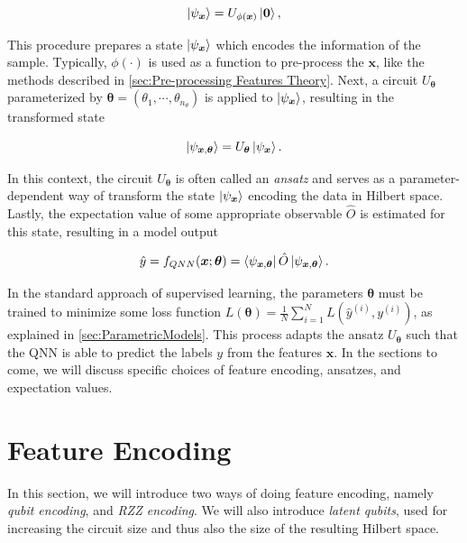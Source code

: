 \begin{equation}
    \ket{\psi_{\boldsymbol{x}}} = U_{\phi(\boldsymbol{x})}\ket{\boldsymbol{0}},
\end{equation}

This procedure prepares a state $\ket{\psi_{\boldsymbol{x}}}$ which encodes the information of the sample. Typically, $\phi(\cdot)$ is used as a function to pre-process the $\boldsymbol{x}$, like the methods described in \cref{sec:Pre-processing Features Theory}. Next, a circuit $U_{\boldsymbol{\theta}}$ parameterized by $\boldsymbol{\theta} = (\theta_1, \cdots, \theta_{n_{\theta}})$ is applied to $\ket{\psi_{\boldsymbol{x}}}$, resulting in the transformed state

\begin{equation}
    \ket{\psi_{\boldsymbol{x}, \boldsymbol{\theta}}} = U_{\boldsymbol{\theta}}\ket{\psi_{\boldsymbol{x}}}.
\end{equation} 

In this context, the circuit $U_{\boldsymbol{\theta}}$ is often called an \emph{ansatz} and serves as a parameter-dependent way of transform the state $\ket{\psi_{\boldsymbol{x}}}$ encoding the data in Hilbert space. Lastly, the expectation value of some appropriate observable $\hat{O}$ is estimated for this state, resulting in a model output 

\begin{equation}\label{eq:QNN}
    \hat{y} = f_{QNN}(\boldsymbol{x};\boldsymbol{\theta}) = \bra{\psi_{\boldsymbol{x}, \boldsymbol{\theta}}} \hat{O} \ket{\psi_{\boldsymbol{x}, \boldsymbol{\theta}}}.
\end{equation} 

In the standard approach of supervised learning, the parameters $\boldsymbol{\theta}$ must be trained to minimize some loss function $L(\boldsymbol{\theta}) = \frac{1}{N}\sum_{i=1}^N L(\hat{y}^{(i)},y^{(i)})$, as explained in \cref{sec:ParametricModels}. This process adapts the ansatz $U_{\boldsymbol{\theta}}$ such that the QNN is able to predict the labels $y$ from the features $\boldsymbol{x}$. In the sections to come, we will discuss specific choices of feature encoding, ansatzes, and expectation values.

\section{Feature Encoding}\label{sec:FeatureEncoding}
In this section, we will introduce two ways of doing feature encoding, namely \emph{qubit encoding}, and \emph{RZZ encoding}. We will also introduce \emph{latent qubits}, used for increasing the circuit size and thus also the size of the resulting Hilbert space. 

